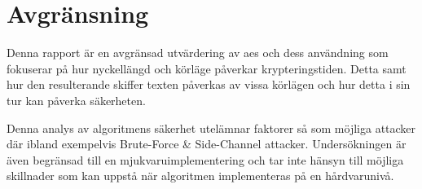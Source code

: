 \section{Avgränsning} %

Denna rapport är en avgränsad utvärdering av \acrshort{aes} och dess användning som fokuserar
 på hur nyckellängd och körläge påverkar krypteringstiden. Detta samt hur den resulterande
skiffer texten påverkas av vissa körlägen och hur detta i sin tur kan påverka säkerheten. \par

Denna analys av algoritmens säkerhet utelämnar faktorer så som möjliga attacker där ibland exempelvis Brute-Force
\& Side-Channel attacker. Undersökningen är även
begränsad till en mjukvaruimplementering och tar inte hänsyn till möjliga skillnader som kan uppstå
när algoritmen implementeras på en hårdvarunivå.